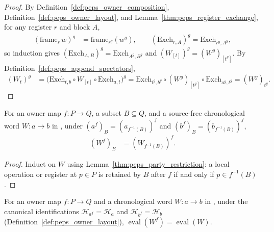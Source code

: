 \begin{proof}\leanok
    By Definition~\ref{def:peps_owner_composition},
    Definition~\ref{def:peps_owner_layout}, and
    Lemma~\ref{thm:peps_register_exchange}, for any register $r$ and block
    $A$,
    \begin{align}
        (\mathrm{frame}_r\,w)^g
         & =\mathrm{frame}_{r^g}(w^g),
        \qquad
        (\mathrm{Exch}_{r,A})^g=\mathrm{Exch}_{r^g,A^g},
        \label{eq:peps_owner_frame_exchange}
    \end{align}
    so induction gives $(\mathrm{Exch}_{A,B})^g=\mathrm{Exch}_{A^g,B^g}$ and
    $(W_{[t]})^g=(W^g)_{[t^g]}$. By Definition~\ref{def:peps_append_spectators},
    \begin{align}
        (W_t)^g
         & =\bigl(\mathrm{Exch}_{t,b}\circ W_{[t]}\circ\mathrm{Exch}_{a,t}\bigr)^g
        =\mathrm{Exch}_{t^g,b^g}\circ(W^g)_{[t^g]}\circ\mathrm{Exch}_{a^g,t^g}
        =(W^g)_{t^g}.
    \end{align}
\end{proof}


\begin{lemma}
    \label{thm:peps_owner_selection_commutation}
    \leanok
    For an owner map $f:P\to Q$, a subset $B\subseteq Q$, and a source-free
    chronological word $W:a\to b$ in
    \cite[proof of Theorem~5.2]{OpenAI2026PolynomialPEPS}, under
    $(a^f)_B=(a_{f^{-1}(B)})^f$ and $(b^f)_B=(b_{f^{-1}(B)})^f$,
    \begin{align}
        (W^f)_B & =(W_{f^{-1}(B)})^f.
        \label{eq:peps_owner_selection_commutation}
    \end{align}
\end{lemma}

\begin{proof}\leanok
    Induct on $W$ using Lemma~\ref{thm:peps_party_restriction}: a local
    operation or register at $p\in P$ is retained by $B$ after $f$ if and only
    if $p\in f^{-1}(B)$.
\end{proof}


\begin{lemma}
    \label{thm:peps_owner_evaluation_identification}
    \leanok
    For an owner map $f:P\to Q$ and a chronological word $W:a\to b$ in
    \cite[proof of Theorem~5.2]{OpenAI2026PolynomialPEPS}, under the canonical
    identifications $\mathcal H_{a^f}=\mathcal H_a$ and
    $\mathcal H_{b^f}=\mathcal H_b$ (Definition~\ref{def:peps_owner_layout}),
    $\operatorname{eval}(W^f)=\operatorname{eval}(W)$.
\end{lemma}

